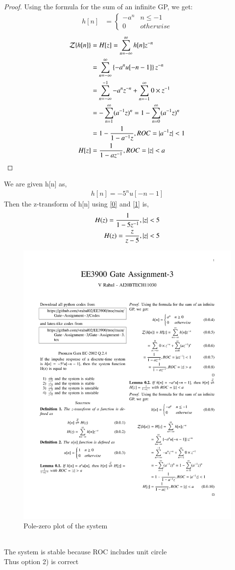 \documentclass[journal,12pt,twocolumn]{IEEEtran}
\begin{document}
\begin{proof}
Using the formula for the sum of an infinite GP, we get:
\begin{align}
    h[n] &= 
    \begin{cases}
    -a^n & n\leq -1\\
    0 & otherwise
    \end{cases}
\end{align}
\begin{align}
   \nonumber \mathcal{Z}\{h[n]\} &= H[z] = \sum_{n = -\infty}^\infty h[n]z^{-n}\\
  \nonumber  &= \sum_{n = -\infty}^\infty \left\{-a^nu[-n-1]\right\}z^{-n}\\
  \nonumber    &= \sum_{n = -\infty}^{-1} {-a^n}z^{-n} + \sum_{n = -1}^{\infty} 0\times z^{-1}\\
  \nonumber  &=-\sum_{n = 1}^{\infty} (a^{-1}z)^n =1-\sum_{n = 0}^{\infty} (a^{-1}z)^n\\
  \nonumber   &= 1-\frac{1}{1 - a^{-1}z} , ROC = \vert a^{-1}z\vert < 1\\
     H[z] &= \frac{1}{1 - az^{-1}} , ROC =  \vert z\vert < a
\end{align}
\end{proof}
We are given h[n] as,
\begin{align}
    h[n]=-5^nu[-n-1]
\end{align}
Then the z-transform of h[n] using \eqref{0} and \eqref{1} is,
\begin{align}
    H(z)=\frac{1}{1-5z^{-1}},\vert z\vert<5\label{2}\\
    H(z)=\frac{z}{z-5},\vert z\vert<5\label{2}
\end{align}
\begin{figure}[!ht]
    \centering
    \includegraphics[width=\columnwidth]{Gate Assignment-3}
    \caption{Pole-zero plot of the system}
    \label{a}
\end{figure}\\
The system is stable because ROC includes unit circle\\
Thus option 2) is correct
\end{document}
